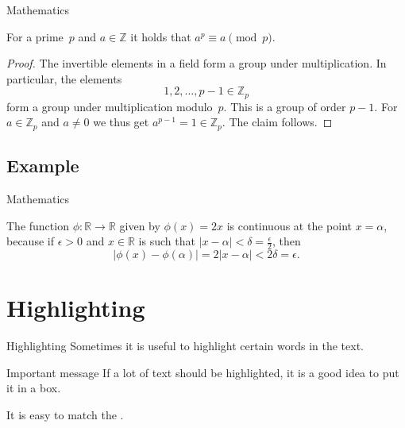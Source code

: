\documentclass[UKenglish]{beamer}
\begin{document}
\begin{frame}{Mathematics}
    \begin{theorem}
        For a prime~\(p\) and \(a \in \mathbb{Z}\) it holds that \(a^p \equiv a \pmod{p}\).
    \end{theorem}

    \begin{proof}
        The invertible elements in a field form a group under multiplication.
        In particular, the elements
        \begin{equation*}
            1, 2, \ldots, p - 1 \in \mathbb{Z}_p
        \end{equation*}
        form a group under multiplication modulo~\(p\).
        This is a group of order \(p - 1\).
        For \(a \in \mathbb{Z}_p\) and \(a \neq 0\) we thus get \(a^{p-1} = 1 \in \mathbb{Z}_p\).
        The claim follows.
    \end{proof}
\end{frame}


\subsection{Example}


\begin{frame}{Mathematics}
    \begin{example}
        The function \(\phi \colon \mathbb{R} \to \mathbb{R}\) given by \(\phi(x) = 2x\) is continuous at the point \(x = \alpha\),
        because if \(\epsilon > 0\) and \(x \in \mathbb{R}\) is such that \(\lvert x - \alpha \rvert < \delta = \frac{\epsilon}{2}\),
        then
        \begin{equation*}
            \lvert \phi(x) - \phi(\alpha)\rvert = 2\lvert x - \alpha \rvert < 2\delta = \epsilon.
        \end{equation*}
    \end{example}
\end{frame}


\section{Highlighting}
\SectionPage


\begin{frame}{Highlighting}
    Sometimes it is useful to \alert{highlight} certain words in the text.

    \begin{alertblock}{Important message}
        If a lot of text should be \alert{highlighted}, it is a good idea to put it in a box.
    \end{alertblock}

    It is easy to match the .
\end{frame}
\end{document}
